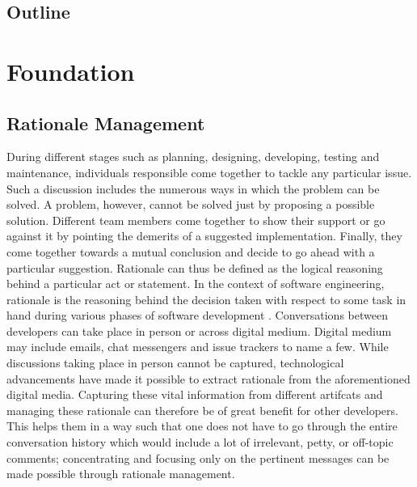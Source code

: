 \documentclass[a4paper,12pt,twoside]{report}
\begin{document}
\section{Outline}


\chapter{Foundation}

\section{Rationale Management}

During different stages such as planning, designing, developing, testing and maintenance, individuals responsible come together to tackle any particular issue. Such a discussion includes the numerous ways in which the problem can be solved. A problem, however, cannot be solved just by proposing a possible solution. Different team members come together to show their support or go against it by pointing the demerits of a suggested implementation. Finally, they come together towards a mutual conclusion and decide to go ahead with a particular suggestion. Rationale can thus be defined as the logical reasoning behind a particular act or statement. In the context of software engineering, rationale is the reasoning behind the decision taken with respect to some task in hand during various phases of software development \cite{Dutoit2006} \cite{Bruegge2009}. 
\bigbreak
Conversations between developers can take place in person or across digital medium. Digital medium may include emails, chat messengers and issue trackers to name a few. While discussions taking place in person cannot be captured, technological advancements have made it possible to extract rationale from the aforementioned digital media. Capturing these vital information from different artifcats and managing these rationale can therefore be of great benefit for other developers. This helps them in a way such that one does not have to go through the entire conversation history which would include a lot of irrelevant, petty, or off-topic comments; concentrating and focusing only on the pertinent messages can be made possible through rationale management. 
\bigbreak
\end{document}
